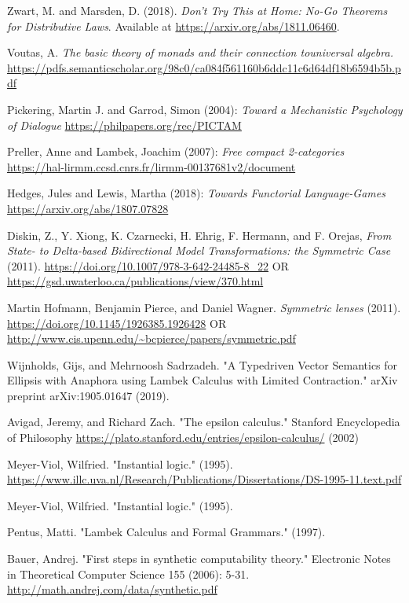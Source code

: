 \documentclass{amsart}
\begin{document}
\begin{thebibliography}{99}
 Zwart, M. and Marsden, D. (2018). \emph{Don't Try This at Home: No-Go Theorems for Distributive Laws}. Available at \url{https://arxiv.org/abs/1811.06460}.

 Voutas, A. \emph{The basic theory of monads and their connection touniversal algebra.} \url{https://pdfs.semanticscholar.org/98c0/ca084f561160b6ddc11c6d64df18b6594b5b.pdf}

 Pickering, Martin J. and Garrod, Simon (2004): \emph{Toward a Mechanistic Psychology of Dialogue} \url{https://philpapers.org/rec/PICTAM}

 Preller, Anne and Lambek, Joachim (2007): \emph{Free compact 2-categories} \url{https://hal-lirmm.ccsd.cnrs.fr/lirmm-00137681v2/document}

 Hedges, Jules and Lewis, Martha (2018): \emph{Towards Functorial Language-Games} \url{https://arxiv.org/abs/1807.07828}

 Diskin, Z., Y. Xiong, K. Czarnecki, H. Ehrig, F. Hermann, and F. Orejas, \emph{From State- to Delta-based Bidirectional Model Transformations: the Symmetric Case} (2011).
\url{https://doi.org/10.1007/978-3-642-24485-8_22} OR \url{https://gsd.uwaterloo.ca/publications/view/370.html}

 Martin Hofmann, Benjamin Pierce, and Daniel Wagner. \emph{Symmetric lenses} (2011). \url{https://doi.org/10.1145/1926385.1926428} OR \url{http://www.cis.upenn.edu/~bcpierce/papers/symmetric.pdf}

 Wijnholds, Gijs, and Mehrnoosh Sadrzadeh. "A Typedriven Vector Semantics for Ellipsis with Anaphora using Lambek Calculus with Limited Contraction." arXiv preprint arXiv:1905.01647 (2019).

 Avigad, Jeremy, and Richard Zach. "The epsilon calculus."
  Stanford Encyclopedia of Philosophy
  \url{https://plato.stanford.edu/entries/epsilon-calculus/} (2002)

 Meyer-Viol, Wilfried. "Instantial logic." (1995).
  \url{https://www.illc.uva.nl/Research/Publications/Dissertations/DS-1995-11.text.pdf}

 Meyer-Viol, Wilfried. "Instantial logic." (1995).

 Pentus, Matti. "Lambek Calculus and Formal Grammars." (1997).

 Bauer, Andrej. "First steps in synthetic computability theory." Electronic Notes in Theoretical Computer Science 155 (2006): 5-31. \url{http://math.andrej.com/data/synthetic.pdf}


\end{thebibliography}
\end{document}
